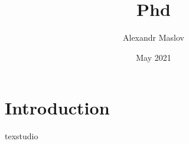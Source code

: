 \documentclass{article}
\title{Phd}
\author{Alexandr Maslov}
\date{May 2021}
\begin{document}
\maketitle

\section{Introduction}
texstudio
\end{document}
